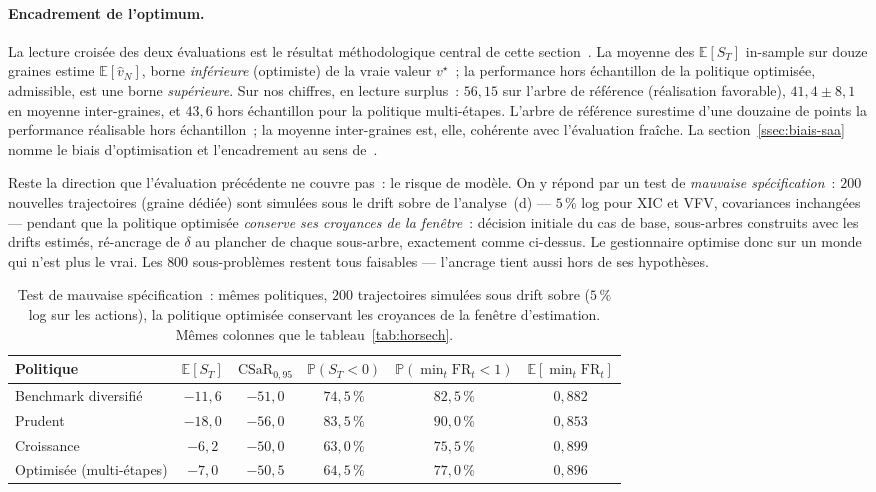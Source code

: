 \documentclass[11pt,letterpaper]{article}
\newcommand{\E}{\mathbb{E}}
\newcommand{\prob}{\mathbb{P}}
\newcommand{\CSaR}{\mathrm{CSaR}}
\theoremstyle{definition}
\begin{document}
\paragraph{Encadrement de l'optimum.}
\begin{sloppypar}
La lecture croisée des deux évaluations est le résultat méthodologique central
de cette section~\cite{Mak1999,KautWallace2007}. La moyenne des
$\E[S_T]$ in-sample sur douze graines estime $\E[\hat v_N]$, borne
\emph{inférieure} (optimiste) de la vraie valeur $v^\star$~; la performance hors
échantillon de la politique optimisée, admissible, est une borne
\emph{supérieure}. Sur nos chiffres, en lecture surplus~: $56{,}15$ sur l'arbre de référence
(réalisation favorable), $41{,}4 \pm 8{,}1$ en moyenne inter-graines, et
$43{,}6$ hors échantillon pour la politique multi-étapes. L'arbre de référence
surestime d'une douzaine de points la performance réalisable hors échantillon~;
la moyenne inter-graines est, elle, cohérente avec l'évaluation fraîche. La
section~\ref{ssec:biais-saa} nomme le biais d'optimisation et l'encadrement au
sens de~\cite{Mak1999}.
\end{sloppypar}

Reste la direction que l'évaluation précédente ne couvre pas~: le risque de
modèle. On y répond par un test de \emph{mauvaise spécification}~: $200$
nouvelles trajectoires (graine dédiée) sont simulées sous le drift sobre de
l'analyse~(d) --- $5\,\%$ log pour XIC et VFV, covariances inchangées ---
pendant que la politique optimisée \emph{conserve ses croyances de la
fenêtre}~: décision initiale du cas de base, sous-arbres construits avec les
drifts estimés, ré-ancrage de $\delta$ au plancher de chaque sous-arbre,
exactement comme ci-dessus. Le gestionnaire optimise donc sur un monde qui
n'est plus le vrai. Les $800$ sous-problèmes restent tous faisables ---
l'ancrage tient aussi hors de ses hypothèses.

\begin{table}[htbp]
\centering
\caption{Test de mauvaise spécification~: mêmes politiques, $200$ trajectoires
simulées sous drift sobre ($5\,\%$ log sur les actions), la politique
optimisée conservant les croyances de la fenêtre d'estimation. Mêmes colonnes
que le tableau~\ref{tab:horsech}.}
\label{tab:stress}
\begin{tabular}{lccccc}
\toprule
Politique & $\E[S_T]$ & $\CSaR_{0{,}95}$ & $\prob(S_T<0)$ &
$\prob(\min_t \mathrm{FR}_t < 1)$ & $\E[\min_t \mathrm{FR}_t]$ \\
\midrule
Benchmark diversifié & $-11{,}6$ & $-51{,}0$ & $74{,}5\,\%$ & $82{,}5\,\%$ & $0{,}882$ \\
Prudent              & $-18{,}0$ & $-56{,}0$ & $83{,}5\,\%$ & $90{,}0\,\%$ & $0{,}853$ \\
Croissance           & $-6{,}2$  & $-50{,}0$ & $63{,}0\,\%$ & $75{,}5\,\%$ & $0{,}899$ \\
Optimisée (multi-étapes) & $-7{,}0$ & $-50{,}5$ & $64{,}5\,\%$ & $77{,}0\,\%$ & $0{,}896$ \\
\bottomrule
\end{tabular}
\end{table}
\end{document}

